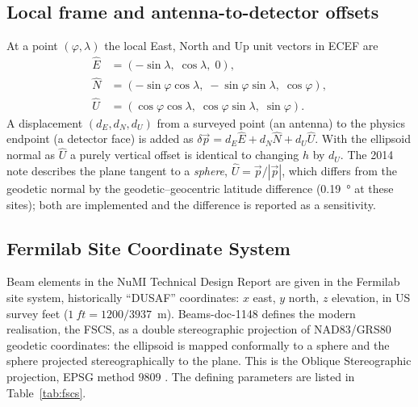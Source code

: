 \documentclass[11pt,letterpaper]{article}
\begin{document}
\subsection{Local frame and antenna-to-detector offsets}
At a point $(\varphi,\lambda)$ the local East, North and Up unit vectors in ECEF are
\begin{equation}
\begin{aligned}
\hat E&=(-\sin\lambda,\;\cos\lambda,\;0),\\
\hat N&=(-\sin\varphi\cos\lambda,\;-\sin\varphi\sin\lambda,\;\cos\varphi),\\
\hat U&=(\cos\varphi\cos\lambda,\;\cos\varphi\sin\lambda,\;\sin\varphi).
\end{aligned}
\label{eq:enu}
\end{equation}
A displacement $(d_E,d_N,d_U)$ from a surveyed point (an antenna) to the physics endpoint (a detector face) is added as $\delta\vec p=d_E\hat E+d_N\hat N+d_U\hat U$.  With the ellipsoid normal as $\hat U$ a purely vertical offset is identical to changing $h$ by $d_U$.  The 2014 note describes the plane tangent to a \emph{sphere}, $\hat U=\vec p/|\vec p|$, which differs from the geodetic normal by the geodetic--geocentric latitude difference (\SI{0.19}{\degree} at these sites); both are implemented and the difference is reported as a sensitivity.

\subsection{Fermilab Site Coordinate System}
\label{sec:fscs}
Beam elements in the NuMI Technical Design Report are given in the Fermilab site system, historically ``DUSAF'' coordinates: $x$ east, $y$ north, $z$ elevation, in US survey feet ($\SI{1}{ft}=1200/3937$~m).  Beams-doc-1148 \cite{oshinowo1997} defines the modern realisation, the FSCS, as a double stereographic projection of NAD83/GRS80 geodetic coordinates: the ellipsoid is mapped conformally to a sphere and the sphere projected stereographically to the plane.  This is the Oblique Stereographic projection, EPSG method 9809 \cite{epsg7-2}.  The defining parameters are listed in Table~\ref{tab:fscs}.
\end{document}
